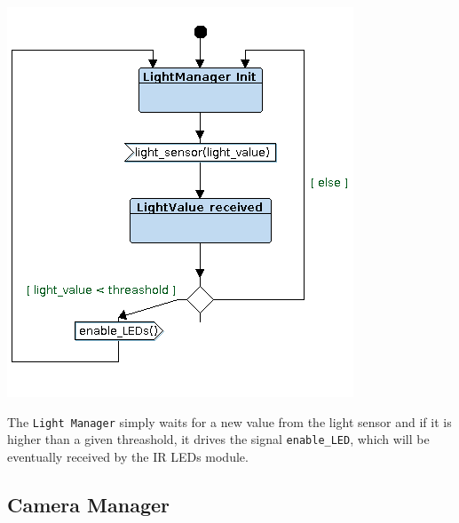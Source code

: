 \documentclass{article}
\begin{document}
\begin{minipage}{\linewidth}
  \centering
  \begin{minipage}{0.6\linewidth}
    \includegraphics[width = \textwidth]{Foscam06.png}
  \end{minipage}
  \begin{minipage}{0.35\linewidth}
    The \texttt{Light Manager} simply waits for a new value from the light sensor
    and if it is higher than a given threashold, it drives the signal \texttt{enable\_LED},
    which will be eventually received by the IR LEDs module.
  \end{minipage}
\end{minipage}

\subsection{Camera Manager}
\label{sec:Camera Manager}
\end{document}
